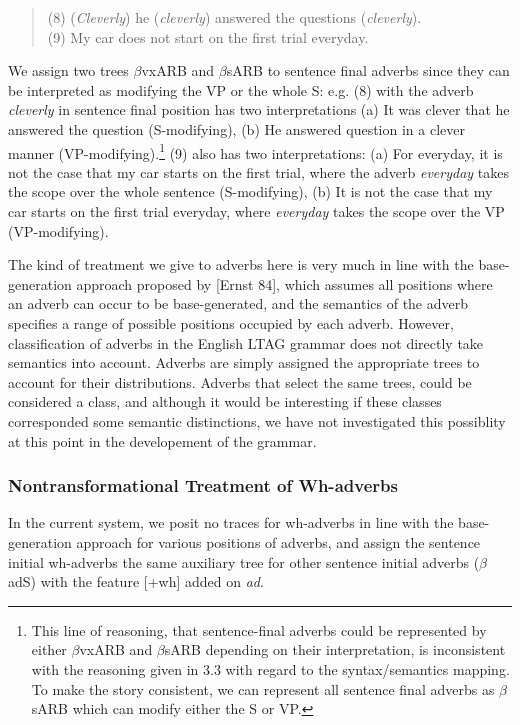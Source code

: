 \begin{verse}
(8) ({\em Cleverly\/}) he ({\em cleverly\/}) answered the questions
({\em cleverly\/}).\\
(9) My car does not start on the first trial everyday.
\end{verse}

We assign two trees $\beta$vxARB and $\beta$sARB to sentence final
adverbs since they can be interpreted as modifying the VP or the whole
S: e.g. (8) with the adverb {\em cleverly\/} in sentence final
position has two interpretations (a) It was clever that he answered
the question (S-modifying), (b) He answered question in a clever
manner (VP-modifying).\footnote{This line of reasoning, that
sentence-final adverbs could be represented by either $\beta$vxARB and
$\beta$sARB depending on their interpretation, is inconsistent with the
reasoning given in 3.3 with regard to the syntax/semantics mapping. To
make the story consistent, we can represent all sentence final adverbs
as $\beta$sARB which can modify either the S or VP.} (9) also has two
interpretations: (a) For everyday, it is not the case that my car
starts on the first trial, where the adverb {\em everyday\/} takes the
scope over the whole sentence (S-modifying), (b) It is not the case
that my car starts on the first trial everyday, where {\em everyday\/}
takes the scope over the VP (VP-modifying).

The kind of treatment we give to adverbs here is very much in line
with the base-generation approach proposed by [Ernst 84], which
assumes all positions where an adverb can occur to be base-generated,
and the semantics of the adverb specifies a range of possible
positions occupied by each adverb.
However, classification of adverbs in the English LTAG grammar does not directly take
semantics into account.  Adverbs are simply assigned the appropriate
trees to account for their distributions.  Adverbs that select the
same trees, could be considered a class, and although it would be interesting
if these classes corresponded some semantic distinctions, we have not
investigated this possiblity at this point in the developement of the
grammar.

\subsubsection{Nontransformational Treatment of Wh-adverbs}

In the current system, we posit no traces for wh-adverbs in line with
the base-generation approach for various positions of adverbs,
and assign the sentence initial wh-adverbs the same auxiliary
tree for other sentence initial adverbs ($\beta$adS) with the feature
[+wh] added on {\em ad\/}. 

